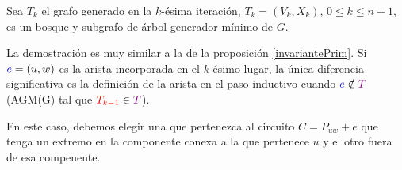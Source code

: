 \begin{proposicion}\label{invarianteKruskal}
	Sea \(T_k\) el grafo generado en la \(k\)-ésima iteración,
	\(T_k = (V_{k}, X_{k})\), \(0\leq k \leq n -1\), es un bosque y subgrafo de árbol generador mínimo de \(G\).
\end{proposicion}

\begin{demo}
	La demostración es muy similar a la de la proposición \ref{invariantePrim}. Si \({\color{blue}e}=(u,w)\) es la arista incorporada en el \(k\)-ésimo lugar, la única diferencia significativa es la definición de la arista  en el paso inductivo cuando \({\color{blue}e}\notin{\color{violet}T}\) (AGM(G) tal que \({\color{red}T_{k-1}}\in{\color{violet}T}\)).
	
	En este caso, debemos elegir una  que pertenezca al circuito \(C = P_{uw} + e\) que tenga un extremo en la componente conexa a la que pertenece \(u\) y el otro fuera de esa compenente.
	
	
\end{demo}